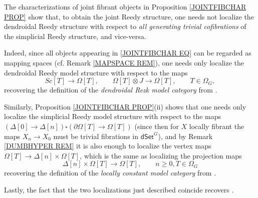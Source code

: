 \documentclass[a4paper,10pt
 ,draft
]{article}%
\begin{document}
\begin{remark}\label{RECOVDEF REM}
The characterizations of joint fibrant objects in Proposition \ref{JOINTFIBCHAR PROP} show that, to obtain the joint Reedy structure, 
one needs not localize the dendroidal Reedy structure with respect to \emph{all generating trivial cofibrations}
of the simplicial Reedy structure, and vice-versa. 

Indeed, since all objects appearing in 
\eqref{JOINTFIBCHAR EQ}
can be regarded as mapping spaces (cf. Remark \ref{MAPSPACE REM}), 
one needs only localize the dendroidal Reedy model structure with respect to the maps
\begin{equation}\label{RECOVDEN REM}
Sc[T] \to \Omega[T], \qquad \Omega[T] \otimes J \to \Omega[T], \qquad T \in \Omega_G,
\end{equation}
recovering 
the definition of the \emph{dendroidal Rezk model category} %
from \cite[Defs. 5.4 and 6.2]{CM13a}.

Similarly, Proposition \ref{JOINTFIBCHAR PROP}(ii) shows that one needs only localize the simplicial Reedy model structure with respect to the maps
$(\Delta[0] \to \Delta[n])\square (\partial \Omega[T] \to \Omega[T])$ (since then for $X$ locally fibrant the maps $X_n \to X_0$ must be trivial fibrations in $\mathsf{dSet}^G$), and by Remark \ref{DUMBHYPER REM}
it is also enough to localize the vertex maps 
$\Omega[T] \to \Delta[n] \times \Omega[T]$, which is the same as localizing 
the projection maps
\[\Delta[n] \times \Omega[T] \to \Omega[T],
\qquad n\geq 0, T \in \Omega_G\]
recovering
the definition of the \emph{locally constant model category} %
from \cite[Def. 4.6]{CM13a}.

Lastly, the fact that the two localizations just described coincide recovers \cite[Thm. 6.6]{CM13a}.
\end{remark}
\end{document}
